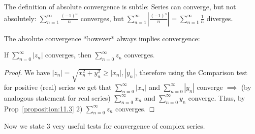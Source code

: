 The definition of absolute convergence is subtle: Series can converge, but not absolutely: $\sum_{n=1}^{\infty} \frac{(-1)^n}{n}$ converges, but $\sum_{n=1}^{\infty} |\frac{(-1)^n}{n}| = \sum_{n=1}^{\infty} \frac{1}{n}$ diverges.

The absolute convergence *however* always implies convergence:

\begin{proposition}\label{proposition:11.6} If $\sum_{n=0}^{\infty} |z_n|$ converges, then $\sum_{n=0}^{\infty} z_n$ converges.
\begin{proof}
    We have $|z_n| = \sqrt{x_n^2 + y_n^2} \geq |x_n|, |y_n|$, therefore using the Comparison test for positive (real) series we get that $\sum_{n=0}^{\infty} |x_n|$ 
    and $\sum_{n=0}^{\infty} |y_n|$ converge $\implies$ (by analogous statement for real series) $\sum_{n=0}^{\infty} x_n$ and $\sum_{n=0}^{\infty} y_n$ converge. 
    Thus, by Prop~\ref{proposition:11.3} 2) $\sum_{n=0}^{\infty} z_n$ converges.
\end{proof}
\end{proposition}

Now we state 3 very useful tests for convergence of complex series.

